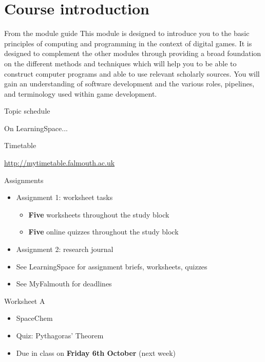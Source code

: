 \part{Course introduction}
\frame{\partpage}

\begin{frame}{From the module guide}
This module is designed to introduce you to the basic principles of computing and programming in the context of digital games. It is designed to complement the other modules through providing a broad foundation on the different methods and techniques which will help you to be able to construct computer programs and able to use relevant scholarly sources. You will gain an understanding of software development and the various roles, pipelines, and terminology used within game development.
\end{frame}

\begin{frame}{Topic schedule}
	\begin{center}
		On LearningSpace...
	\end{center}
\end{frame}

\begin{frame}{Timetable}
	\begin{center}
		\url{http://mytimetable.falmouth.ac.uk}
	\end{center}
\end{frame}

\begin{frame}{Assignments}
	\begin{itemize}
		\pause\item Assignment 1: worksheet tasks
			\begin{itemize}
				\pause\item \textbf{Five} worksheets throughout the study block
				\pause\item \textbf{Five} online quizzes throughout the study block
			\end{itemize}
		\pause\item Assignment 2: research journal
		\pause\item See LearningSpace for assignment briefs, worksheets, quizzes
		\pause\item See MyFalmouth for deadlines
	\end{itemize}
\end{frame}

\begin{frame}{Worksheet A}
	\begin{itemize}
		\item SpaceChem
		\item Quiz: Pythagoras' Theorem
		\item Due in class on \textbf{Friday 6th October} (next week)
	\end{itemize}
\end{frame}

